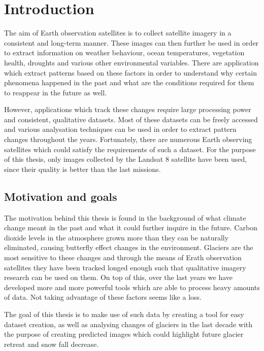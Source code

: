 \documentclass[12pt, a4paper]{report}
\begin{document}
	\newpage{}

	\chapter{Introduction}
	
	\par The aim of Earth observation satellites is to collect satellite imagery in a consistent and long-term manner. These images can then further be used in order to extract information on weather behaviour, ocean temperatures, vegetation health, droughts and various other environmental variables. There are application which extract patterns based on these factors in order to understand why certain phenomena happened in the past and what are the conditions required for them to reappear in the future as well. 
	
	\par However, applications which track these changes require large processing power and consistent, qualitative datasets. Most of these datasets can be freely accessed and various analysation techniques can be used in order to extract pattern changes throughout the years. Fortunately, there are numerous Earth observing satellites which could satisfy the requirements of such a dataset. For the purpose of this thesis, only images collected by the Landsat 8 satellite have been used, since their quality is better than the last missions.
	
	\section{Motivation and goals}
	
	\par The motivation behind this thesis is found in the background of what climate change meant in the past and what it could further inquire in the future. Carbon dioxide levels in the atmosphere grown more than they can be naturally eliminated, causing butterfly effect changes in the environment. Glaciers are the most sensitive to these changes and through the means of Erath observation satellites they have been tracked longed enough such that qualitative imagery research can be used on them. On top of this, over the last years we have developed more and more powerful tools which are able to process heavy amounts of data. Not taking advantage of these factors seems like a loss.
	
	\par The goal of this thesis is to make use of such data by creating a tool for easy dataset creation, as well as analysing changes of glaciers in the last decade with the purpose of creating predicted images which could highlight future glacier retreat and snow fall decrease.
\end{document}
